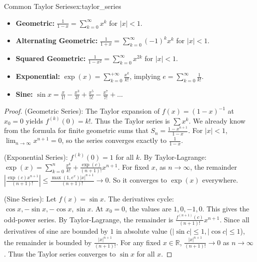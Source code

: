 \documentclass[11pt, a4paper]{article}
\begin{document}
\begin{example}{Common Taylor Series}{ex:taylor_series}
\begin{itemize}
    \item \textbf{Geometric:} $\frac{1}{1-x} = \sum_{k=0}^\infty x^k$ for $|x| < 1$.
    \item \textbf{Alternating Geometric:} $\frac{1}{1+x} = \sum_{k=0}^\infty (-1)^k x^k$ for $|x| < 1$.
    \item \textbf{Squared Geometric:} $\frac{1}{1-x^2} = \sum_{k=0}^\infty x^{2k}$ for $|x| < 1$.
    \item \textbf{Exponential:} $\exp(x) = \sum_{k=0}^{+\infty} \frac{x^k}{k!}$, implying $e = \sum_{k=0}^\infty \frac{1}{k!}$.
    \item \textbf{Sine:} $\sin x = \frac{x}{1!} - \frac{x^3}{3!} + \frac{x^5}{5!} - \frac{x^7}{7!} + \dots$
\end{itemize}
\end{example}
\begin{proof}
(Geometric Series): The Taylor expansion of $f(x) = (1-x)^{-1}$ at $x_0 = 0$ yields $f^{(k)}(0) = k!$.
Thus the Taylor series is $\sum x^k$. We already know from the formula for finite geometric sums that $S_n = \frac{1 - x^{n+1}}{1 - x}$.
For $|x| < 1$, $\lim_{n \to \infty} x^{n+1} = 0$, so the series converges exactly to $\frac{1}{1-x}$.

(Exponential Series): $f^{(k)}(0) = 1$ for all $k$. By Taylor-Lagrange: $\exp(x) = \sum_{k=0}^n \frac{x^k}{k!} + \frac{\exp(c)}{(n+1)!} x^{n+1}$.
For fixed $x$, as $n \to \infty$, the remainder $\left| \frac{\exp(c) x^{n+1}}{(n+1)!} \right| \le \frac{\max(1, e^x) |x|^{n+1}}{(n+1)!} \to 0$. So it converges to $\exp(x)$ everywhere.

(Sine Series): Let $f(x) = \sin x$. The derivatives cycle: $\cos x, -\sin x, -\cos x, \sin x$.
At $x_0 = 0$, the values are $1, 0, -1, 0$. This gives the odd-power series.
By Taylor-Lagrange, the remainder is $\frac{f^{(n+1)}(c)}{(n+1)!} x^{n+1}$.
Since all derivatives of sine are bounded by $1$ in absolute value ($|\sin c| \le 1, |\cos c| \le 1$), the remainder is bounded by $\frac{|x|^{n+1}}{(n+1)!}$.
For any fixed $x \in \mathbb{R}$, $\frac{|x|^{n+1}}{(n+1)!} \to 0$ as $n \to \infty$. Thus the Taylor series converges to $\sin x$ for all $x$.
\end{proof}
\end{document}
